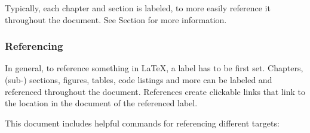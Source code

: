 
Typically, each chapter and section is labeled, to more easily reference it throughout the document. See Section  for more information.

\subsubsection{Referencing}

In general, to reference something in \LaTeX{}, a label has to be first set.
Chapters, (sub-) sections, figures, tables, code listings and more can be labeled and referenced throughout the document.
References create clickable links that link to the location in the document of the referenced label.

This document includes helpful commands for referencing different targets:

